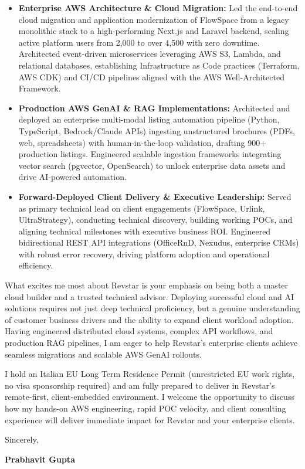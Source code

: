 \documentclass[11pt,a4paper]{article}
\begin{document}
\begin{itemize}[leftmargin=1.4em, itemsep=3pt, topsep=3pt, parsep=0pt]
    \item \textbf{Enterprise AWS Architecture \& Cloud Migration:} Led the end-to-end cloud migration and application modernization of FlowSpace from a legacy monolithic stack to a high-performing Next.js and Laravel backend, scaling active platform users from 2,000 to over 4,500 with zero downtime. Architected event-driven microservices leveraging AWS S3, Lambda, and relational databases, establishing Infrastructure as Code practices (Terraform, AWS CDK) and CI/CD pipelines aligned with the AWS Well-Architected Framework.
    \item \textbf{Production AWS GenAI \& RAG Implementations:} Architected and deployed an enterprise multi-modal listing automation pipeline (Python, TypeScript, Bedrock/Claude APIs) ingesting unstructured brochures (PDFs, web, spreadsheets) with human-in-the-loop validation, drafting 900+ production listings. Engineered scalable ingestion frameworks integrating vector search (pgvector, OpenSearch) to unlock enterprise data assets and drive AI-powered automation.
    \item \textbf{Forward-Deployed Client Delivery \& Executive Leadership:} Served as primary technical lead on client engagements (FlowSpace, Urlink, UltraStrategy), conducting technical discovery, building working POCs, and aligning technical milestones with executive business ROI. Engineered bidirectional REST API integrations (OfficeRnD, Nexudus, enterprise CRMs) with robust error recovery, driving platform adoption and operational efficiency.
\end{itemize}

\vspace{5pt}

\noindent What excites me most about Revstar is your emphasis on being both a master cloud builder and a trusted technical advisor. Deploying successful cloud and AI solutions requires not just deep technical proficiency, but a genuine understanding of customer business drivers and the ability to expand client workload adoption. Having engineered distributed cloud systems, complex API workflows, and production RAG pipelines, I am eager to help Revstar's enterprise clients achieve seamless migrations and scalable AWS GenAI rollouts.

\vspace{5pt}

\noindent I hold an Italian EU Long Term Residence Permit (unrestricted EU work rights, no visa sponsorship required) and am fully prepared to deliver in Revstar's remote-first, client-embedded environment. I welcome the opportunity to discuss how my hands-on AWS engineering, rapid POC velocity, and client consulting experience will deliver immediate impact for Revstar and your enterprise clients.

\vspace{10pt}

\noindent Sincerely,

\vspace{6pt}

\noindent \textbf{Prabhavit Gupta}
\end{document}
